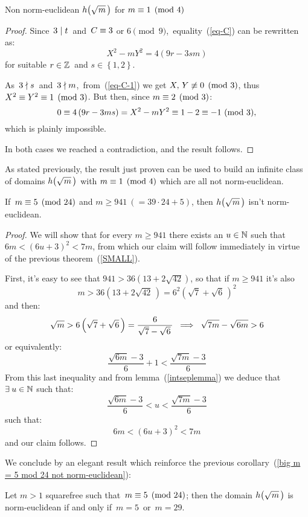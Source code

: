 \begin{subsection}{Non norm-euclidean $\hh{m}$ for $m\equiv 1 \pmod 4$}
\begin{proof}
\smallskip
Since\, $3 \mid t$\, and\, $C \equiv 3$ or $6 \pmod 9$,\,
equality~(\ref{eq-C}) can be rewritten as:
\begin{equation}\label{eq-C-1}
X^2 - m Y^2 = 4(9r - 3sm)
\end{equation}
for suitable $r \in \mathbb{Z}$ \,and $s \in \left\{1, 2\right\}$.

As \,$3 \nmid s$\, and \,$3 \nmid m$,\,
from~(\ref{eq-C-1}) we get $X,\, Y \not\equiv 0 \pmod 3$,
thus\, $X^2 \equiv Y^2 \equiv 1 \pmod 3$.
But then, since $m \equiv 2 \pmod 3$:
$$
  0 \equiv 4\left(9r - 3ms\right) = X^2 - m Y^2 \equiv 1 - 2 
  \equiv -1\ (\mathrm{mod}\ 3),
$$
which is plainly impossible.

\medskip
In both cases we reached a contradiction, and the result follows.
\end{proof}

As stated previously, the result just proven can be used to build an
infinite class of domains $\hh{m}$ with $m \equiv 1 \pmod 4$ which
are all not norm-euclidean.

\begin{cor}\label{big m = 5 mod 24 not norm-euclidean}
If\, $m \equiv 5 \pmod{24}$ and $m \geq 941\ (= 39 \cdot 24 + 5)$,
then $\hh{m}$ isn't norm-euclidean.
\end{cor}
%
\begin{proof}
We will show that for every $m \geq 941$ there exists an $u \in \mathbb{N}$ such
that\, $6m < {(6u + 3)}^2 < 7m$, from which our claim will follow
immediately in virtue of the previous theorem~(\ref{SMALL}).

First, it's easy to see that $941 > 36(13 + 2 \sqrt{42})$, so that
if $m \geq 941$ it's also
$$
  m > 36\left(13 + 2 \sqrt{42}\,\right) =
  6^2 {\left(\sqrt{7} + \sqrt{6}\,\right)}^2
$$
and then:
$$
    \sqrt{m} > 6\left(\sqrt{7} + \sqrt{6}\,\right) =
    \frac{6}{\sqrt{7} - \sqrt{6}\phantom{\,}}
  \ \then \ %
    \sqrt{7m} - \sqrt{6m} > 6
$$
or equivalently:
$$ \frac{\sqrt{6m} - 3}{6} + 1 < \frac{\sqrt{7m} - 3}{6} $$
From this last inequality and from lemma~(\ref{intseplemma}) we deduce
that $\exists\: u \in \mathbb{N}$ such that:
$$\frac{\sqrt{6m} - 3}{6} < u < \frac{\sqrt{7m} - 3}{6}$$
\ie such that:
$$6m < {(6u + 3)}^2 < 7m$$
and our claim follows.
\end{proof}

We conclude by an elegant result which reinforce the previous
corollary~(\ref{big m = 5 mod 24 not norm-euclidean}):

\begin{thm}%
\label{second_partial_classification_of_norm-euclidean_domains}
Let $m > 1$ squarefree such that\, $m \equiv 5 \pmod{24}$;
then the domain $\hh{m}$ is norm-euclidean if and only if\,
$m = 5$\, or\, $m = 29$.
\end{thm}


\end{subsection}
